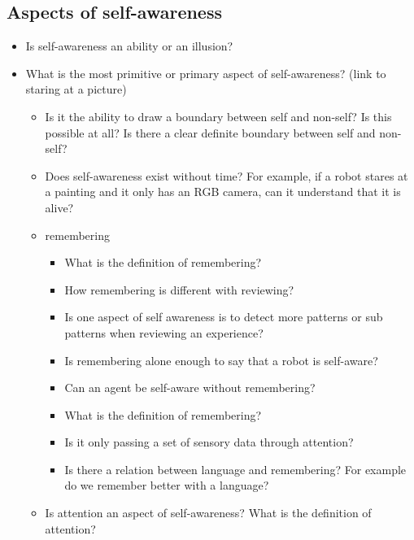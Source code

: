 \subsection{Aspects of self-awareness}
\begin{itemize}
    \item Is self-awareness an ability or an illusion?
\end{itemize}
\begin{itemize}
    \item What is the most primitive or primary aspect of self-awareness? (link to staring at a picture)
    \begin{itemize}
        \item Is it the ability to draw a boundary between self and non-self? Is this possible at all? Is there a clear definite boundary between self and non-self?
    \end{itemize}
    \begin{itemize}
        \item Does self-awareness exist without time? For example, if a robot stares at a painting and it only has an RGB camera, can it understand that it is alive?
        \item remembering
        \begin{itemize}
            \item What is the definition of remembering?
            \item How remembering is different with reviewing?
            \item Is one aspect of self awareness is to detect more patterns or sub patterns when reviewing an experience?
        \end{itemize}
        \begin{itemize}
            \item Is remembering alone enough to say that a robot is self-aware?
            \item Can an agent be self-aware without remembering?
            \item What is the definition of remembering?
            \item Is it only passing a set of sensory data through attention?
            \item Is there a relation between language and remembering? For example do we remember better with a language?
        \end{itemize}
        \item Is attention an aspect of self-awareness? What is the definition of attention?
    \end{itemize}
\end{itemize}
